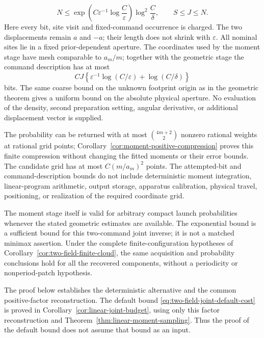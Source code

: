 \begin{theorem}
\begin{equation}
 N\le\exp\!\left(C\varepsilon^{-1}
                       \log\frac{C}{\varepsilon}\right)
                    \log^2\frac{C}{\delta},
                \qquad S\le J\le N.
\end{equation}
Here every bit, site visit and fixed-command occurrence is charged.
The two displacements remain $a$ and $-a$; their length does not
shrink with $\varepsilon$.  All nominal sites lie in a fixed
prior-dependent aperture.  The coordinates used by the moment stage
have mesh comparable to $a_m/m$; together with the geometric stage
the command description has at most
\begin{equation}\label{eq:two-field-joint-description}
 CJ\left\{\varepsilon^{-1}\log(C/\varepsilon)
                            +\log(C/\delta)\right\}
\end{equation}
bits.  The same coarse bound on the unknown footprint origin as in
the geometric theorem gives a uniform bound on the absolute physical
aperture.  No evaluation of the density, second preparation setting,
angular derivative, or additional displacement vector is supplied.

The probability can be returned with at most
$\binom{4m+2}{2}$ nonzero rational weights at rational grid points;
Corollary~\ref{cor:moment-positive-compression} proves this finite
compression without changing the fitted moments or their error bounds.
The candidate grid has at most $C(m/a_m)^2$ points. The attempted-bit
and command-description bounds do not include deterministic moment
integration, linear-program arithmetic, output storage, apparatus
calibration, physical travel, positioning, or realization of the
required coordinate grid.

The moment stage itself is valid for arbitrary compact launch
probabilities whenever the stated geometric estimates are available.
The exponential bound is a sufficient bound for this two-command
joint inverse; it is not a matched minimax assertion.  Under the
complete finite-configuration hypotheses of
Corollary~\ref{cor:two-field-finite-cloud}, the same acquisition and
probability conclusions hold for all the recovered components,
without a periodicity or nonperiod-patch hypothesis.
\end{theorem}
The proof below establishes the deterministic alternative and the common
positive-factor reconstruction. The default bound
\eqref{eq:two-field-joint-default-cost} is proved in
Corollary~\ref{cor:linear-joint-budget}, using only this factor
reconstruction and Theorem~\ref{thm:linear-moment-sampling}. Thus the
proof of the default bound does not assume that bound as an input.
